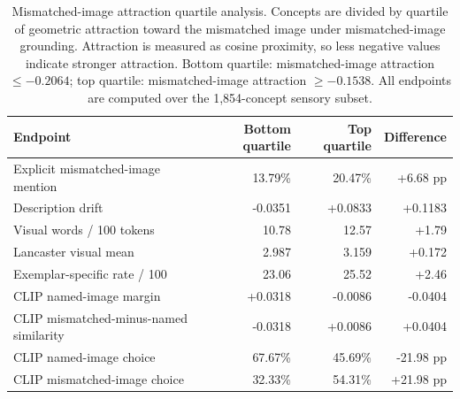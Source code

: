 \documentclass{article}
\begin{document}
\begin{table}[!htbp]
\centering
\caption{Mismatched-image attraction quartile analysis. Concepts are divided by quartile of geometric attraction toward the mismatched image under mismatched-image grounding. Attraction is measured as cosine proximity, so less negative values indicate stronger attraction. Bottom quartile: mismatched-image attraction \(\le -0.2064\); top quartile: mismatched-image attraction \(\ge -0.1538\). All endpoints are computed over the 1,854-concept sensory subset.}
\label{tab:mismatch_attraction_quartiles}
\small
\begin{tabular}{lrrr}
\toprule
Endpoint & Bottom quartile & Top quartile & Difference \\
\midrule
Explicit mismatched-image mention & 13.79\% & 20.47\% & +6.68 pp \\
Description drift & -0.0351 & +0.0833 & +0.1183 \\
Visual words / 100 tokens & 10.78 & 12.57 & +1.79 \\
Lancaster visual mean & 2.987 & 3.159 & +0.172 \\
Exemplar-specific rate / 100 & 23.06 & 25.52 & +2.46 \\
CLIP named-image margin & +0.0318 & -0.0086 & -0.0404 \\
CLIP mismatched-minus-named similarity & -0.0318 & +0.0086 & +0.0404 \\
CLIP named-image choice & 67.67\% & 45.69\% & -21.98 pp \\
CLIP mismatched-image choice & 32.33\% & 54.31\% & +21.98 pp \\
\bottomrule
\end{tabular}
\end{table}
\end{document}
